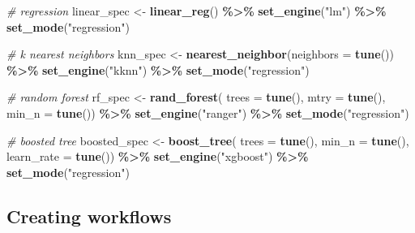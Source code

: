 \documentclass[
]{article}
\newenvironment{Shaded}{\begin{snugshade}}{\end{snugshade}}
\newcommand{\AttributeTok}[1]{\textcolor[rgb]{0.13,0.29,0.53}{#1}}
\newcommand{\CommentTok}[1]{\textcolor[rgb]{0.56,0.35,0.01}{\textit{#1}}}
\newcommand{\FunctionTok}[1]{\textcolor[rgb]{0.13,0.29,0.53}{\textbf{#1}}}
\newcommand{\NormalTok}[1]{#1}
\newcommand{\OtherTok}[1]{\textcolor[rgb]{0.56,0.35,0.01}{#1}}
\newcommand{\SpecialCharTok}[1]{\textcolor[rgb]{0.81,0.36,0.00}{\textbf{#1}}}
\newcommand{\StringTok}[1]{\textcolor[rgb]{0.31,0.60,0.02}{#1}}
\begin{document}
\begin{Shaded}
\begin{Highlighting}[]
\CommentTok{\# regression}
\NormalTok{linear\_spec }\OtherTok{\textless{}{-}} \FunctionTok{linear\_reg}\NormalTok{() }\SpecialCharTok{\%\textgreater{}\%}
               \FunctionTok{set\_engine}\NormalTok{(}\StringTok{"lm"}\NormalTok{) }\SpecialCharTok{\%\textgreater{}\%}
               \FunctionTok{set\_mode}\NormalTok{(}\StringTok{"regression"}\NormalTok{)}

\CommentTok{\# k nearest neighbors}
\NormalTok{knn\_spec }\OtherTok{\textless{}{-}} \FunctionTok{nearest\_neighbor}\NormalTok{(}\AttributeTok{neighbors =} \FunctionTok{tune}\NormalTok{()) }\SpecialCharTok{\%\textgreater{}\%} 
  \FunctionTok{set\_engine}\NormalTok{(}\StringTok{"kknn"}\NormalTok{) }\SpecialCharTok{\%\textgreater{}\%} 
  \FunctionTok{set\_mode}\NormalTok{(}\StringTok{"regression"}\NormalTok{)}

\CommentTok{\# random forest}
\NormalTok{rf\_spec }\OtherTok{\textless{}{-}} \FunctionTok{rand\_forest}\NormalTok{(}
  \AttributeTok{trees =} \FunctionTok{tune}\NormalTok{(),       }
  \AttributeTok{mtry =} \FunctionTok{tune}\NormalTok{(),        }
  \AttributeTok{min\_n =} \FunctionTok{tune}\NormalTok{()) }\SpecialCharTok{\%\textgreater{}\%}
  \FunctionTok{set\_engine}\NormalTok{(}\StringTok{"ranger"}\NormalTok{) }\SpecialCharTok{\%\textgreater{}\%}
  \FunctionTok{set\_mode}\NormalTok{(}\StringTok{"regression"}\NormalTok{)}

\CommentTok{\# boosted tree}
\NormalTok{boosted\_spec }\OtherTok{\textless{}{-}} \FunctionTok{boost\_tree}\NormalTok{(}
    \AttributeTok{trees =} \FunctionTok{tune}\NormalTok{(),}
    \AttributeTok{min\_n =} \FunctionTok{tune}\NormalTok{(),}
    \AttributeTok{learn\_rate =} \FunctionTok{tune}\NormalTok{()) }\SpecialCharTok{\%\textgreater{}\%}
  \FunctionTok{set\_engine}\NormalTok{(}\StringTok{"xgboost"}\NormalTok{) }\SpecialCharTok{\%\textgreater{}\%}
  \FunctionTok{set\_mode}\NormalTok{(}\StringTok{"regression"}\NormalTok{)}
\end{Highlighting}
\end{Shaded}

\hypertarget{creating-workflows}{%
\subsection{Creating workflows}\label{creating-workflows}}
\end{document}

